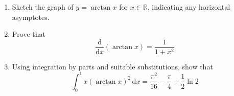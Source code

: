 \documentclass[leqno]{article}
\begin{document}
\begin{enumerate}[
  label=\textbf{\arabic*.},
  leftmargin=*,
  topsep=0pt,
  partopsep=0pt,
  parsep=0pt
]
\begin{enumerate}[label=\textbf{(\roman*)}]
  \item Sketch the graph of $y=\arctan x$ for $x\in\mathbb{R}$, indicating any horizontal asymptotes.  \\
  \item Prove that
  \[
  \frac{\mathrm{d}}{\mathrm{d}x}(\arctan x)=\frac{1}{1+x^2}
  \]
  \item Using integration by parts and suitable substitutions, show that
  \[
  \int_0^1 x(\arctan x)^2\,\mathrm{d}x=\frac{\pi^2}{16}-\frac{\pi}{4}+\frac{1}{2}\ln 2
  \]
\end{enumerate}
\end{enumerate}
\end{document}
